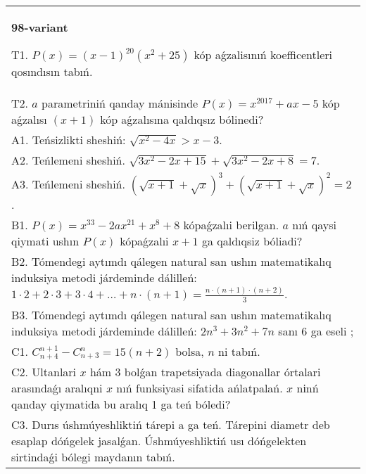 \documentclass{article}
\begin{document}
\begin{tabular}{m{17cm}}
\textbf{98-variant}
\newline

T1. \(P(x) = (x - 1)^{20}\left( x^{2} + 25 \right)\) kóp aǵzalisınıń koefficentleri qosındısın tabıń. \\
T2. \(a\) parametriniń qanday mánisinde \(P(x) = x^{2017} + ax - 5\) kóp aǵzalısı \((x + 1)\) kóp aǵzalısına qaldıqsız bólinedi? \\
A1. Teńsizlikti sheshiń: \(\sqrt{x^{2} - 4x} > x - 3\). \\
A2. Teńlemeni sheshiń. \(\sqrt{3x^{2} - 2x + 15} + \sqrt{3x^{2} - 2x + 8} = 7\). \\
A3. Teńlemeni sheshiń. \((\sqrt{x + 1} + \sqrt{x})^{3} + (\sqrt{x + 1} + \sqrt{x})^{2} = 2\). \\
B1. \(P(x) = x^{33} - 2ax^{21} + x^{8} + 8\) kópaǵzalıi berilgan. \(a\) nıń qaysi qiymati ushın \(P(x)\) kópaǵzalıi \(x + 1\) ga qaldıqsiz bóliadi? \\
B2. Tómendegi aytımdı qálegen natural san ushın matematikalıq induksiya metodi járdeminde dálilleń: \(1 \cdot 2 + 2 \cdot 3 + 3 \cdot 4 + \ldots + n \cdot (n + 1) = \frac{n \cdot (n + 1) \cdot (n + 2)}{3}\). \\
B3. Tómendegi aytımdı qálegen natural san ushın matematikalıq induksiya metodi járdeminde dálilleń: \(2n^{3} + 3n^{2} + 7n\) sanı 6 ga eseli ; \\
C1. \(C_{n + 4}^{n + 1} - C_{n + 3}^{n} = 15(n + 2)\) bolsa, \(n\) ni tabıń. \\
C2. Ultanlari \(x\) hám 3 bolǵan trapetsiyada diagonallar órtalari arasındaǵı aralıqni \(x\) nıń funksiyasi sifatida ańlatpalań. \(x\) nіnń qanday qiymatida bu aralıq 1 ga teń bóledi? \\
C3. Durıs úshmúyeshliktiń tárepi a ga teń. Tárepini diametr deb esaplap dóńgelek jasalǵan. Úshmúyeshliktiń usı dóńgelekten sirtindaǵi bólegi maydanın tabıń. \\

\end{tabular}
\vspace{1cm}
\end{document}
